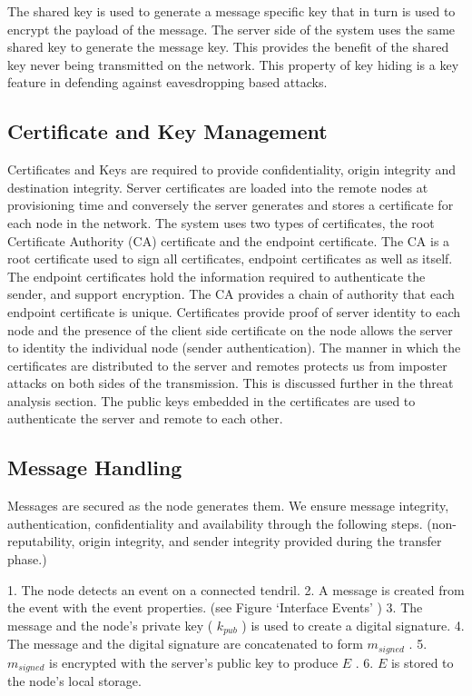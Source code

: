 The shared key is used to generate a message specific key that in turn is used to encrypt the payload of the message. The server side of the system uses the same shared key to generate the message key. This provides the benefit of the shared key never being transmitted on the network. This property of key hiding is a key feature in defending against eavesdropping based attacks.

\subsection{Certificate and Key Management}
Certificates and Keys are required to provide confidentiality, origin integrity and destination integrity. Server certificates are loaded into the remote nodes at provisioning time and conversely the server generates and stores a certificate for each node in the network. The system uses two types of certificates, the root Certificate Authority (CA) certificate and the endpoint certificate. 
The CA is a root certificate used to sign all certificates, endpoint certificates as well as itself. The endpoint certificates hold the information required to authenticate the sender, and support encryption. The CA provides a chain of authority that each endpoint certificate is unique. 
Certificates provide proof of server identity to each node and the presence of the client side certificate on the node allows the server to identity the individual node (sender authentication). 
The manner in which the certificates are distributed to the server and remotes protects us from imposter attacks on both sides of the transmission. This is discussed further in the threat analysis section. 
  The public keys embedded in the certificates are used to authenticate the server and remote to each other. 

\subsection{Message Handling}
  Messages are secured as the node generates them. We ensure message integrity, authentication, confidentiality and availability through the following steps. (non-reputability, origin integrity, and sender integrity provided during the transfer phase.) 

  1.  The node detects an event on a connected tendril.
  2.  A message is created from the event with the event properties. (see Figure ‘Interface Events’ )
  3.  The message and the node’s private key ( $k_{pub}$ ) is used to create a digital signature.
  4.  The message and the digital signature are concatenated to form $m_{signed}$ .
  5.  $m_{signed}$ is encrypted with the server’s public key to produce $E$ .
  6.  $E$  is stored to the node’s local storage.
   
